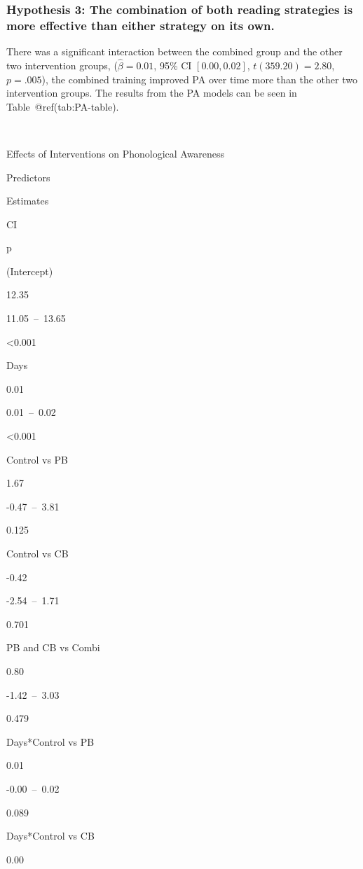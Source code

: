 \documentclass[
  ,
]{article}
\begin{document}
\hypertarget{hypothesis-3-the-combination-of-both-reading-strategies-is-more-effective-than-either-strategy-on-its-own.}{%
\subsubsection{Hypothesis 3: The combination of both reading strategies
is more effective than either strategy on its
own.}\label{hypothesis-3-the-combination-of-both-reading-strategies-is-more-effective-than-either-strategy-on-its-own.}}

There was a significant interaction between the combined group and the
other two intervention groups, (\(\hat{\beta} = 0.01\), 95\% CI
\([0.00, 0.02]\), \(t(359.20) = 2.80\), \(p = .005\)), the combined
training improved PA over time more than the other two intervention
groups. The results from the PA models can be seen in
Table~@ref(tab:PA-table).

~

Effects of Interventions on Phonological Awareness

Predictors

Estimates

CI

p

(Intercept)

12.35

11.05~--~13.65

\textless0.001

Days

0.01

0.01~--~0.02

\textless0.001

Control vs PB

1.67

-0.47~--~3.81

0.125

Control vs CB

-0.42

-2.54~--~1.71

0.701

PB and CB vs Combi

0.80

-1.42~--~3.03

0.479

Days*Control vs PB

0.01

-0.00~--~0.02

0.089

Days*Control vs CB

0.00
\end{document}
